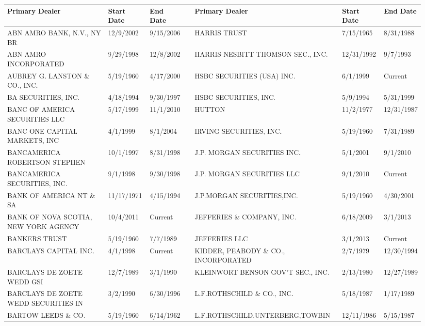 \begin{tabular}{lllllll}
\toprule
Primary Dealer & Start Date & End Date &  & Primary Dealer & Start Date & End Date \\
\midrule
ABN AMRO BANK, N.V., NY BR           & 12/9/2002 & 9/15/2006 &  & HARRIS TRUST                        & 7/15/1965 & 8/31/1988 \\
ABN AMRO INCORPORATED                & 9/29/1998 & 12/8/2002 &  & HARRIS-NESBITT THOMSON SEC., INC.   & 12/31/1992 & 9/7/1993 \\
AUBREY G. LANSTON \& CO., INC.       & 5/19/1960 & 4/17/2000 &  & HSBC SECURITIES (USA) INC.           & 6/1/1999 & Current \\
BA SECURITIES, INC.                 & 4/18/1994 & 9/30/1997 &  & HSBC SECURITIES, INC.                & 5/9/1994 & 5/31/1999 \\
BANC OF AMERICA SECURITIES LLC            & 5/17/1999 & 11/1/2010 &  & HUTTON                               & 11/2/1977 & 12/31/1987 \\
BANC ONE CAPITAL MARKETS, INC       & 4/1/1999 & 8/1/2004 &  & IRVING SECURITIES, INC.              & 5/19/1960 & 7/31/1989 \\
BANCAMERICA ROBERTSON STEPHEN       & 10/1/1997 & 8/31/1998 &  & J.P. MORGAN SECURITIES INC.         & 5/1/2001 & 9/1/2010 \\
BANCAMERICA SECURITIES, INC.        & 9/1/1998 & 9/30/1998 &  & J.P. MORGAN SECURITIES LLC & 9/1/2010 & Current \\
BANK OF AMERICA NT \& SA             & 11/17/1971 & 4/15/1994 &  & J.P.MORGAN SECURITIES,INC.           & 5/19/1960 & 4/30/2001 \\
BANK OF NOVA SCOTIA, NEW YORK AGENCY & 10/4/2011 & Current &  & JEFFERIES \& COMPANY, INC. & 6/18/2009 & 3/1/2013 \\
BANKERS TRUST                        & 5/19/1960 & 7/7/1989 &  & JEFFERIES LLC & 3/1/2013 & Current \\
BARCLAYS CAPITAL INC.                & 4/1/1998 & Current &  & KIDDER, PEABODY \& CO., INCORPORATED & 2/7/1979 & 12/30/1994 \\
BARCLAYS DE ZOETE WEDD GSI           & 12/7/1989 & 3/1/1990 &  & KLEINWORT BENSON  GOV'T SEC., INC.   & 2/13/1980 & 12/27/1989 \\
BARCLAYS DE ZOETE WEDD SECURITIES IN & 3/2/1990 & 6/30/1996 &  & L.F.ROTHSCHILD \& CO., INC.      & 5/18/1987 & 1/17/1989 \\
BARTOW LEEDS \& CO.                   & 5/19/1960 & 6/14/1962 &  & L.F.ROTHSCHILD,UNTERBERG,TOWBIN & 12/11/1986 & 5/15/1987 \\

\end{tabular}
